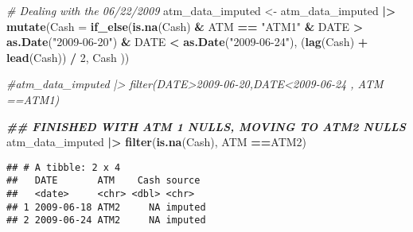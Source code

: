 \documentclass[
]{article}
\newenvironment{Shaded}{\begin{snugshade}}{\end{snugshade}}
\newcommand{\AttributeTok}[1]{\textcolor[rgb]{0.13,0.29,0.53}{#1}}
\newcommand{\CommentTok}[1]{\textcolor[rgb]{0.56,0.35,0.01}{\textit{#1}}}
\newcommand{\DecValTok}[1]{\textcolor[rgb]{0.00,0.00,0.81}{#1}}
\newcommand{\DocumentationTok}[1]{\textcolor[rgb]{0.56,0.35,0.01}{\textbf{\textit{#1}}}}
\newcommand{\FunctionTok}[1]{\textcolor[rgb]{0.13,0.29,0.53}{\textbf{#1}}}
\newcommand{\NormalTok}[1]{#1}
\newcommand{\OtherTok}[1]{\textcolor[rgb]{0.56,0.35,0.01}{#1}}
\newcommand{\SpecialCharTok}[1]{\textcolor[rgb]{0.81,0.36,0.00}{\textbf{#1}}}
\newcommand{\StringTok}[1]{\textcolor[rgb]{0.31,0.60,0.02}{#1}}
\begin{document}
\begin{Shaded}
\begin{Highlighting}[]
\CommentTok{\# Dealing with the 06/22/2009}
\NormalTok{atm\_data\_imputed }\OtherTok{\textless{}{-}}\NormalTok{ atm\_data\_imputed }\SpecialCharTok{|\textgreater{}} \FunctionTok{mutate}\NormalTok{(}\AttributeTok{Cash =} \FunctionTok{if\_else}\NormalTok{(}\FunctionTok{is.na}\NormalTok{(Cash) }\SpecialCharTok{\&}\NormalTok{ ATM }\SpecialCharTok{==} \StringTok{"ATM1"} \SpecialCharTok{\&}\NormalTok{ DATE }\SpecialCharTok{\textgreater{}} \FunctionTok{as.Date}\NormalTok{(}\StringTok{"2009{-}06{-}20"}\NormalTok{) }\SpecialCharTok{\&}\NormalTok{ DATE }\SpecialCharTok{\textless{}} \FunctionTok{as.Date}\NormalTok{(}\StringTok{"2009{-}06{-}24"}\NormalTok{),}
\NormalTok{                                  (}\FunctionTok{lag}\NormalTok{(Cash) }\SpecialCharTok{+} \FunctionTok{lead}\NormalTok{(Cash)) }\SpecialCharTok{/} \DecValTok{2}\NormalTok{, Cash ))}

\CommentTok{\#atm\_data\_imputed |\textgreater{} filter(DATE\textgreater{}\textquotesingle{}2009{-}06{-}20\textquotesingle{},DATE\textless{}\textquotesingle{}2009{-}06{-}24\textquotesingle{} , ATM ==\textquotesingle{}ATM1\textquotesingle{})}

\DocumentationTok{\#\# FINISHED WITH ATM 1 NULLS, MOVING TO ATM2 NULLS}
\NormalTok{atm\_data\_imputed }\SpecialCharTok{|\textgreater{}} \FunctionTok{filter}\NormalTok{(}\FunctionTok{is.na}\NormalTok{(Cash), ATM }\SpecialCharTok{==}\StringTok{\textquotesingle{}ATM2\textquotesingle{}}\NormalTok{)}
\end{Highlighting}
\end{Shaded}

\begin{verbatim}
## # A tibble: 2 x 4
##   DATE       ATM    Cash source 
##   <date>     <chr> <dbl> <chr>  
## 1 2009-06-18 ATM2     NA imputed
## 2 2009-06-24 ATM2     NA imputed
\end{verbatim}
\end{document}
